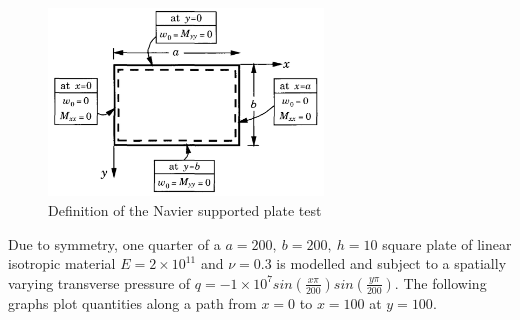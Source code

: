 \begin{figure}[H]
	\centering
	\def\svgwidth{\columnwidth}
	\includegraphics[width=7.3cm]{images/navier_plate_def.png}
	\caption{Definition of the Navier supported plate test \cite{reddy2004mechanics}}
	\label{validation:pic navier plate}
\end{figure}

Due to symmetry, one quarter of a $a = 200,\ b = 200,\ h = 10$ square plate of linear isotropic material $E = 2\times 10^{11}$ and $\nu = 0.3$ is modelled and subject to a spatially varying transverse pressure of $q = -1\times 10^7 sin(\frac{x\pi}{200})sin(\frac{y\pi}{200})$. The following graphs plot quantities along a path from $x=0$ to $x=100$ at $y=100$.

